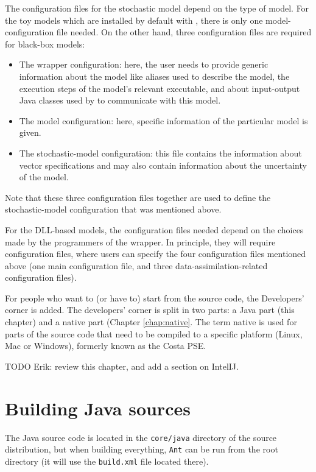 The configuration files for the stochastic model depend on the type of model. For the toy models which are installed by default with \oda, there is only one model-configuration file needed. On the other hand, three configuration files are required for black-box models: 
\begin{itemize}
\item The wrapper configuration: here, the user needs to provide generic information about the model like aliases used to describe the model, the execution steps of the model’s relevant executable, and about input-output Java classes used by \oda to communicate with this model.
\item The model configuration: here, specific information of the particular model is given.
\item The stochastic-model configuration: this file contains the information about vector specifications and may also contain information about the uncertainty of the model. 
\end{itemize}
Note that these three configuration files together are used to define the stochastic-model configuration that was mentioned above.

For the DLL-based models, the configuration files needed depend on the choices made by the programmers of the \oda wrapper. In principle, they will require configuration files, where users can specify the four configuration files mentioned above (one main configuration file, and three data-assimilation-related configuration files). 



For people who want to (or have to) start from the \oda source code, the Developers' corner is added. The developers' corner is split in two parts: a Java part (this chapter) and a native part (Chapter \ref{chap:native}. The term native is used for parts of the source code that need to be compiled to a specific platform (Linux, Mac or Windows), formerly known as the Costa PSE.

TODO Erik: review this chapter, and add a section on IntelIJ.

\section{Building Java sources}
The \oda Java source code is located in the \verb|core/java| directory of the source distribution, but when building everything, \verb|Ant| can be run from the \oda root directory (it will use the \verb|build.xml| file located there).

